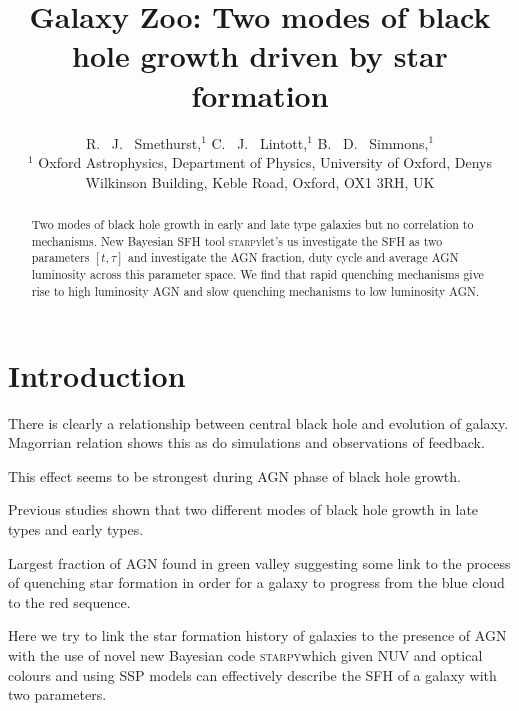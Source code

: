 \documentclass[useAMS,usenatbib]{mn2e}
\def\starpy {\textsc{starpy}}
\begin{document}
\title[AGN & Star Formation]{Galaxy Zoo: Two modes of black hole growth driven by star formation}
\author[Smethurst et al. 2014]{R. ~J. ~Smethurst,$^{1}$ C. ~J. ~Lintott,$^{1}$ B. ~D. ~Simmons,$^{1}$
\\ $^1$ Oxford Astrophysics, Department of Physics, University of Oxford, Denys Wilkinson Building, Keble Road, Oxford, OX1 3RH, UK 
\\
}

\maketitle

\begin{abstract}
Two modes of black hole growth in early and late type galaxies but no correlation to mechanisms. New Bayesian SFH tool \starpy let's us investigate the SFH as two parameters $[t, \tau]$ and investigate the AGN fraction, duty cycle and average AGN luminosity across this parameter space. We find that rapid quenching mechanisms give rise to high luminosity AGN and slow quenching mechanisms to low luminosity AGN.\footnotemark[1]

\end{abstract}


\section{Introduction}

There is clearly a relationship between central black hole and evolution of galaxy. Magorrian relation shows this as do simulations and observations of feedback. 

This effect seems to be strongest during AGN phase of black hole growth. 

Previous studies shown that two different modes of black hole growth in late types and early types. 

Largest fraction of AGN found in green valley suggesting some link to the process of quenching star formation in order for a galaxy to progress from the blue cloud to the red sequence. 

Here we try to link the star formation history of galaxies to the presence of AGN with the use of novel new Bayesian code \starpy which given NUV and optical colours and using SSP models can effectively describe the SFH of a galaxy with two parameters. 
\end{document}
